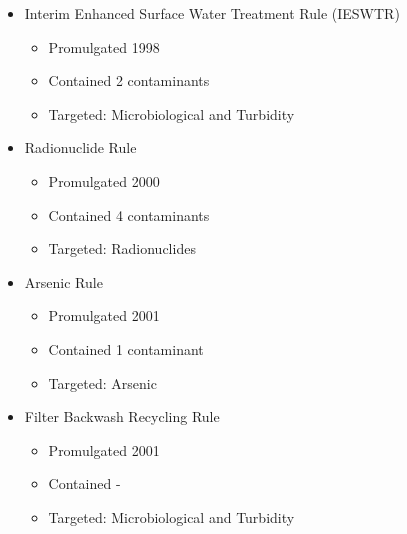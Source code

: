 \documentclass{article}
\begin{document}
\begin{itemize}
\begin{itemize}
\end{itemize}
\item Interim Enhanced Surface Water Treatment Rule (IESWTR)
\begin{itemize}
\item Promulgated 1998
\item Contained 2 contaminants
\item Targeted: Microbiological and Turbidity
\end{itemize}
\item Radionuclide Rule
\begin{itemize}
\item Promulgated 2000
\item Contained 4 contaminants
\item Targeted: Radionuclides
\end{itemize}
\item Arsenic Rule
\begin{itemize}
\item Promulgated 2001
\item Contained 1 contaminant
\item Targeted: Arsenic
\end{itemize}
\item Filter Backwash Recycling Rule
\begin{itemize}
\item Promulgated 2001
\item Contained -
\item Targeted: Microbiological and Turbidity
\end{itemize}
\end{itemize}
\end{document}
